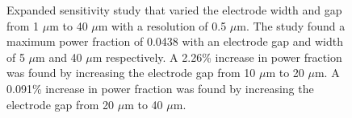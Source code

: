 \begin{figure}[h]
\begin{subfigure}[b]{0.49\textwidth}
    \end{subfigure}
    \caption[Analytic Sensitivity]{Expanded sensitivity study that varied the electrode width and gap from 1 $\mu$m to 40 $\mu$m with a resolution of 0.5 $\mu$m. The study found a maximum power fraction of 0.0438 with an electrode gap and width of 5 $\mu$m  and 40 $\mu$m  respectively. A 2.26\% increase in power fraction was found by increasing the electrode gap from 10 $\mu$m to 20 $\mu$m. A 0.091\% increase in power fraction was found by increasing the electrode gap from 20 $\mu$m to 40 $\mu$m.}
    \label{fig:analytic_sensitivity}
\end{figure}




